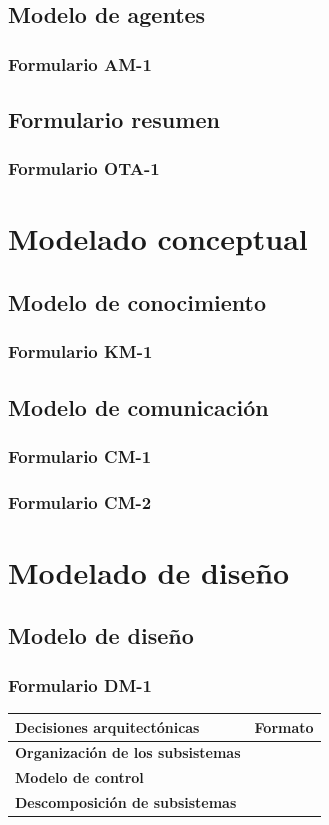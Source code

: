\documentclass[a4paper,11pt]{article}
\begin{document}
		\subsection{Modelo de agentes}
			\subsubsection{Formulario AM-1}
		\subsection{Formulario resumen}
			\subsubsection{Formulario OTA-1}
	\section{Modelado conceptual}
		\subsection{Modelo de conocimiento}
			\subsubsection{Formulario KM-1}
		\subsection{Modelo de comunicación}
			\subsubsection{Formulario CM-1}
			\subsubsection{Formulario CM-2}
	\section{Modelado de diseño}
		\subsection{Modelo de diseño}
			\subsubsection{Formulario DM-1}
			\begin{center}
				\begin{tabular}{| l | l |}
					\hline
					\textbf{Decisiones arquitectónicas} & \textbf{Formato} \\
					\hline
					\textbf{Organización de los subsistemas} & \\
					\hline
					\textbf{Modelo de control} & \\
					\hline
					\textbf{Descomposición de subsistemas} & \\
					\hline
				\end{tabular}
			\end{center}
\end{document}
